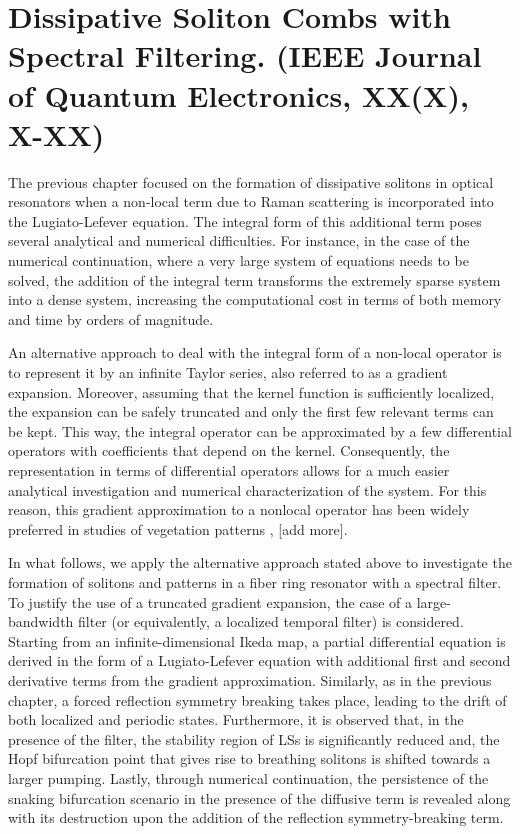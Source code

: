 \chapter{Dissipative Soliton Combs with Spectral Filtering. (IEEE Journal of Quantum Electronics, XX(X), X-XX)}

The previous chapter focused on the formation of dissipative solitons in optical
resonators when a non-local term due to Raman scattering is incorporated into the Lugiato-Lefever equation. The
integral form of this additional term poses several analytical and numerical difficulties.
For instance, in the case of the numerical continuation, where a very
large system of equations needs to be solved, the addition of the integral term transforms the extremely sparse
system into a dense system, increasing the computational cost in terms of both memory and time
by orders of magnitude.

An alternative approach to deal with the integral form of a non-local operator is to represent
it by an infinite Taylor series, also referred to as a gradient expansion. Moreover, 
assuming that the kernel function is sufficiently localized, the expansion can be
safely truncated and only the first few relevant terms can be kept. This way, the integral operator can be
approximated by a few differential operators with coefficients that depend on
the kernel. Consequently, the representation in terms of differential operators
allows for a much easier analytical investigation and numerical characterization of the system.
For this reason, this gradient approximation to a nonlocal operator has been widely 
preferred in studies of vegetation patterns \cite{lefever1997origin}, [add more].

In what follows, we apply the alternative approach stated above to investigate
the formation of solitons and patterns in a fiber ring resonator with a spectral filter.
To justify the use of a truncated gradient expansion, the case of a large-bandwidth filter
(or equivalently, a localized temporal filter) is considered. Starting from an infinite-dimensional
Ikeda map, a partial differential equation is derived in the form of a Lugiato-Lefever equation with additional
first and second derivative terms from the gradient approximation. Similarly, as in the previous chapter,
a forced reflection symmetry breaking takes place, leading to the drift of both localized and periodic states.
Furthermore, it is observed that, in the presence of the filter, the stability region of LSs is significantly reduced
and, the Hopf bifurcation point that gives rise to breathing solitons is shifted towards a larger pumping.
Lastly, through numerical continuation, the persistence of the snaking bifurcation scenario in
the presence of the diffusive term is revealed along with its destruction upon the addition of the reflection symmetry-breaking term.

